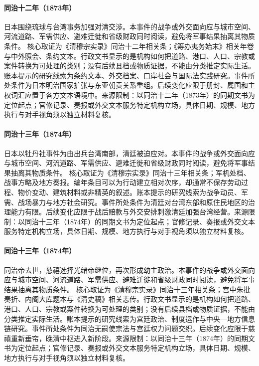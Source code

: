 \hypertarget{civic:EQ-1873-JAPAN-RYUKYU-DISPUTE}{}\paragraph{同治十二年（1873年）}日本围绕琉球与台湾事务加强对清交涉。本事件的战争或外交面向应与城市空间、河流道路、军需供应、避难迁徙和省级财政同时阅读，避免将军事结果抽离其物质条件。 核心取证为《清穆宗实录》同治十二年相关条；《筹办夷务始末》相关年卷与中外照会、条约文本。行政文书显示的是机构如何把道路、港口、人口、宗教或案件转换为可处理的类别；没有后续县档或物质证据，不能由分类推定实际生活。账本提示的研究线索为条约文本、外交档案、口岸社会与国际法实践研究。事件所处条件为日本明治国家扩张与东亚朝贡关系重组。后续变化应限于册封、属国和主权词汇应置于各方文本语境中。来源限制：以同治十二年（1873年）的同期文书为定位起点；官修记录、奏报或外交文本服务特定机构立场，具体日期、规模、地方执行与对手视角须以独立材料复核。
\hypertarget{civic:EQ-1874-JAPANESE-TAIWAN-EXPEDITION}{}\paragraph{同治十三年（1874年）}日本以牡丹社事件为由出兵台湾南部，清廷被迫应对。本事件的战争或外交面向应与城市空间、河流道路、军需供应、避难迁徙和省级财政同时阅读，避免将军事结果抽离其物质条件。 核心取证为《清穆宗实录》同治十三年相关条；军机处档、战事方略及地方奏报。编年条目可以为行动建立相对次序，却通常不保存劳动过程、物价变动、建筑材料或非精英的叙述。账本提示的研究线索为战争动员、军需、战场暴力与地方社会研究。事件所处条件为清廷对台湾东部和原住民地区的治理能力有限。后续变化应限于战后赔款与外交安排刺激清廷加强台湾经营。来源限制：以同治十三年（1874年）的同期文书为定位起点；官修记录、奏报或外交文本服务特定机构立场，具体日期、规模、地方执行与对手视角须以独立材料复核。
\hypertarget{civic:EQ-1874-TONGZHI-DEATH}{}\paragraph{同治十三年（1874年）}同治帝去世，慈禧选择光绪帝继位，再次形成幼主政治。本事件的战争或外交面向应与城市空间、河流道路、军需供应、避难迁徙和省级财政同时阅读，避免将军事结果抽离其物质条件。 核心取证为《清穆宗实录》同治十三年相关条；宫中朱批奏折、内阁大库题本与《清史稿》相关志传。行政文书显示的是机构如何把道路、港口、人口、宗教或案件转换为可处理的类别；没有后续县档或物质证据，不能由分类推定实际生活。账本提示的研究线索为宫廷政治、制度运作与中央—地方信息链研究。事件所处条件为同治无嗣使宗法与宫廷权力问题交织。后续变化应限于慈禧重新垂帘，晚清中枢进入新阶段。来源限制：以同治十三年（1874年）的同期文书为定位起点；官修记录、奏报或外交文本服务特定机构立场，具体日期、规模、地方执行与对手视角须以独立材料复核。
